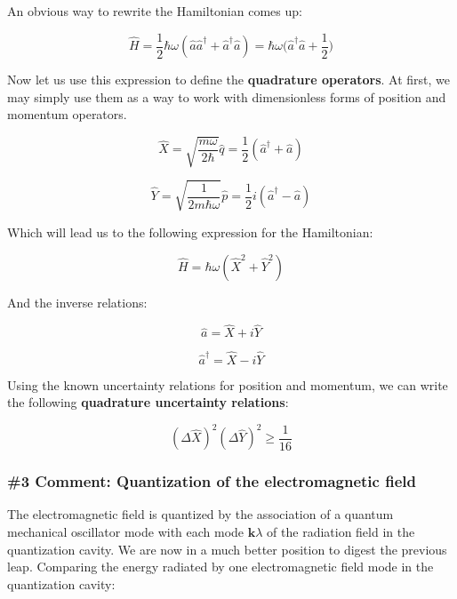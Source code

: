 \documentclass[12pt,a4paper]{report}
\begin{document}
An obvious way to rewrite the Hamiltonian comes up:

\begin{equation}
    \hat{H}=\frac{1}{2}\hbar\omega(\hat{a}\hat{a}^{\dag}+\hat{a}^{\dag}\hat{a})=\hbar\omega\Big(\hat{a}^{\dag}\hat{a}+\frac{1}{2}\Big)
\end{equation}

Now let us use this expression to define the \textbf{quadrature operators}. At first, we may simply use them as a way to work with dimensionless forms of position and momentum operators. 

\begin{equation}
    \hat{X}=\sqrt{\frac{m\omega}{2\hbar}}\hat{q}=\frac{1}{2}(\hat{a}^{\dag}+\hat{a})
\end{equation}

\begin{equation}
    \hat{Y}=\sqrt{\frac{1}{2m\hbar\omega}}\hat{p}=\frac{1}{2}i(\hat{a}^{\dag}-\hat{a})
\end{equation}

Which will lead us to the following expression for the Hamiltonian:

\begin{equation}
    \hat{H}=\hbar\omega(\hat{X}^2+\hat{Y}^2)
\end{equation}

And the inverse relations:

\begin{equation}
    \hat{a}=\hat{X}+i\hat{Y}
\end{equation}

\begin{equation}
    \hat{a}^{\dag}=\hat{X}-i\hat{Y}
\end{equation}

Using the known uncertainty relations for position and momentum, we can write the following \textbf{quadrature uncertainty relations}:

\begin{equation}
    (\Delta \hat{X})^2(\Delta \hat{Y})^2 \ge \frac{1}{16}
\end{equation}

\subsubsection{\#3 Comment: Quantization of the electromagnetic field}

The electromagnetic field is quantized by the association of a quantum mechanical oscillator mode with each mode $\textbf{k}\lambda$ of the radiation field in the quantization cavity. We are now in a much better position to digest the previous leap. Comparing the energy radiated by one electromagnetic field mode in the quantization cavity:
\end{document}
